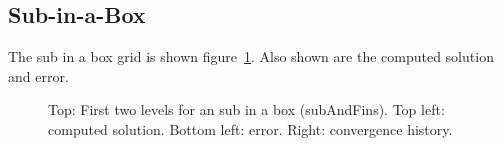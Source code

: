\documentclass{article}
\begin{document}


\subsection{Sub-in-a-Box}

  The sub in a box grid is shown figure~\ref{fig:sub}. Also shown are the computed
solution and error.


{
\newcommand{\figWidth}{10cm}
\newcommand{\trimfig}[2]{\trimPlotb{#1}{#2}{.0}{.0}{.2}{.2}}
\newcommand{\figWidtha}{7.cm}
\newcommand{\trimfiga}[2]{\trimPlotb{#1}{#2}{.0}{.0}{. }{.0}}
\begin{figure}[hbt]
\begin{center}
\end{center}
\caption{Top: First two levels for an sub in a box (subAndFins). 
Top left: computed solution. Bottom left: error. Right: convergence history.}
\label{fig:sub}
\end{figure}
}
\end{document}
